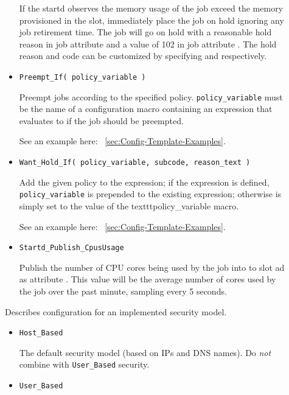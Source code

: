 \begin{description}
\begin{itemize}
	If the startd observes the memory usage of the job exceed
	the memory provisioned in the slot,
	immediately place the job on hold
	ignoring any job retirement time.
	The job will go on hold with a reasonable
	hold reason in job attribute  and a value of 102 in job
	attribute .  The hold reason and code can be customized by
	specifying  and
	 respectively.

	\item \texttt{Preempt\_If( policy\_variable )}

	Preempt jobs according to the specified policy.
	\texttt{policy\_variable} must be the name of a configuration macro
	containing an expression that evaluates to  if the job
	should be preempted.

	See an example here: ~\ref{sec:Config-Template-Examples}.

	\item \texttt{Want\_Hold\_If( policy\_variable, subcode, reason\_text )}

	Add the given policy to the  expression; if the
	 expression is defined, \texttt{policy\_variable}
	is prepended to the existing expression; otherwise
	 is simply set to the value of the
	texttt{policy\_variable} macro.

	See an example here: ~\ref{sec:Config-Template-Examples}.

	\item \texttt{Startd\_Publish\_CpusUsage}

	Publish the number of CPU cores being used by the job into
	to slot ad as attribute . This value will
	be the average number of cores used by the job over the
	past minute, sampling every 5 seconds.
  \end{itemize}

\label{usecategory:SECURITY}
\item[\MacroNI{SECURITY category}]
  Describes configuration for an implemented security model.
  \begin{itemize}
    \item \texttt{Host\_Based}

    The default security model (based on IPs and DNS names).
    Do \emph{not} combine with \texttt{User\_Based} security.

    \item \texttt{User\_Based}


\end{itemize}
\end{description}
